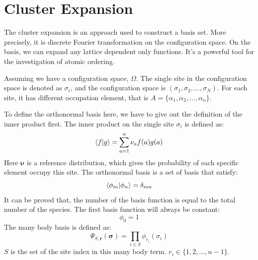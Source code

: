 \documentclass[../main.tex]{subfiles}
\begin{document}
\section{\textbf{Cluster Expansion}}

The cluster expansion is an approach used to construct a basis set. More precisely, it is discrete Fourier transformation on the configuration space.
On the basis, we can expand any lattice dependent only functions. It's a powerful tool for the investigation of atomic ordering.

Assuming we have a configuration space, $\Omega$. The single site in the configuration space is denoted as 
$\sigma_i$, and the configuration space is $(\sigma_1, \sigma_2, \dots, \sigma_N)$. For each site, it has different occupation
element, that is $A = \{\alpha_1, \alpha_2, \dots, \alpha_n\}$.

To define the orthonormal basis here, we have to give out the definition of the inner product first. The inner product
on the single site $\sigma_i$ is defined as:
\begin{equation}
    \braket{f}{g} =\sum_{a=1}^{n} \nu_a f(a)g(a)
\end{equation}
Here $\bm{\nu}$ is a reference distribution, which gives the probability of each specific element occupy this site.
The orthonormal basis is a set of basis that satisfy:
\begin{equation}
    \braket{\phi_m}{\phi_n} = \delta_{mn}
\end{equation}
It can be proved that, the number of the basis function is equal to the total number of the species.
The first basis function will always be constant:
\begin{equation}
    \phi_0 = 1
\end{equation}
The many body basis is defined as:
\begin{equation}
    \Psi_{S,\bm{r}}(\bm{\sigma}) = \prod_{i \in S}\phi_{r_i}(\sigma_i) 
\end{equation}
$S$ is the set of the site index in this many body term. $r_i \in \{1, 2, \dots, n-1\}$.
\end{document}
